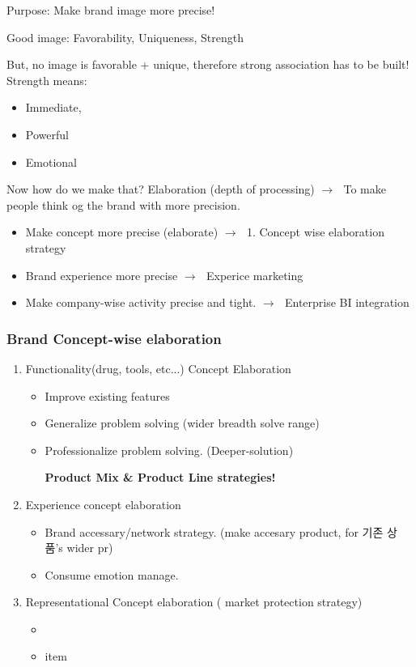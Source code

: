\documentclass[12pt]{article}
\newcommand{\ra}{$\rightarrow \text{ }$}
\newcommand{\tb}{\textbf}
\begin{document}
\begin{itemize}
Purpose: Make brand image more precise!

Good image: Favorability, Uniqueness, Strength

But, no image is favorable + unique, therefore strong association has to be built! Strength means:

\begin{itemize}
	\item Immediate,
	\item Powerful
	\item Emotional
\end{itemize}

Now how do we make that?
Elaboration (depth of processing)
\ra To make people think og the brand with more precision.

\begin{itemize}
	\item Make concept more precise (elaborate) \ra 1. Concept wise elaboration strategy
	\item Brand experience more precise \ra Experice marketing
	\item Make company-wise activity precise and tight. \ra Enterprise BI integration
\end{itemize}

\subsubsection{Brand Concept-wise elaboration}

\begin{enumerate}
	\item Functionality(drug, tools, etc...) Concept Elaboration
	\begin{itemize}
		\item Improve existing features
		\item Generalize problem solving (wider breadth solve range)
		\item Professionalize problem solving. (Deeper-solution)

		\tb{Product Mix \& Product Line strategies!}
	\end{itemize}
	\item Experience concept elaboration
	\begin{itemize}
		\item Brand accessary/network strategy. (make accesary product, for 기존 상품's wider pr) %
		\item Consume emotion manage.
	\end{itemize}
	\item Representational Concept elaboration ( market protection strategy)
	\begin{itemize}
		\item
		\item item
	\end{itemize}
\end{enumerate}


\end{itemize}
\end{document}
